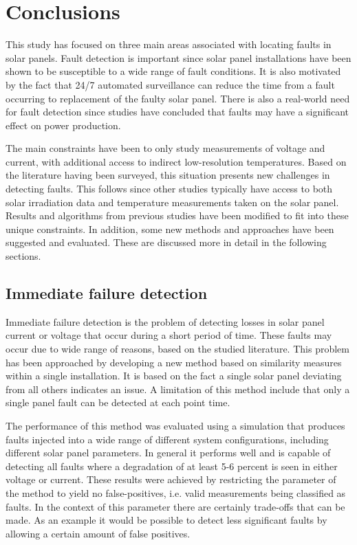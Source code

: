 \chapter{Conclusions}
This study has focused on three main areas associated with locating faults in solar panels.
Fault detection is important since solar panel installations have been shown to be susceptible to a wide range of fault conditions.
It is also motivated by the fact that 24/7 automated surveillance can reduce the time from a fault occurring to replacement of the faulty solar panel.
There is also a real-world need for fault detection since studies have concluded that faults may have a significant effect on power production.

The main constraints have been to only study measurements of voltage and current, with additional access to indirect low-resolution temperatures.
Based on the literature having been surveyed, this situation presents new challenges in detecting faults.
This follows since other studies typically have access to both solar irradiation data and temperature measurements taken on the solar panel.
Results and algorithms from previous studies have been modified to fit into these unique constraints.
In addition, some new methods and approaches have been suggested and evaluated.
These are discussed more in detail in the following sections.

\section{Immediate failure detection}
Immediate failure detection is the problem of detecting losses in solar panel current or voltage that occur during a short period of time.
These faults may occur due to wide range of reasons, based on the studied literature.
This problem has been approached by developing a new method based on similarity measures within a single installation.
It is based on the fact a single solar panel deviating from all others indicates an issue.
A limitation of this method include that only a single panel fault can be detected at each point time.

The performance of this method was evaluated using a simulation that produces faults injected into a wide range of different system configurations, including different solar panel parameters.
In general it performs well and is capable of detecting all faults where a degradation of at least 5-6 percent is seen in either voltage or current.
These results were achieved by restricting the parameter of the method to yield no false-positives, i.e. valid measurements being classified as faults.
In the context of this parameter there are certainly trade-offs that can be made.
As an example it would be possible to detect less significant faults by allowing a certain amount of false positives.

